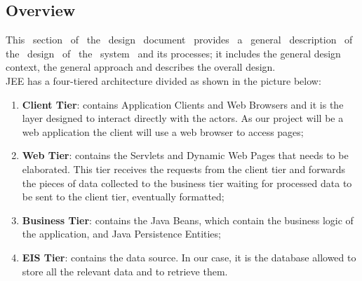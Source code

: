\documentclass[a4paper,11pt]{report} %
\begin{document}
	\subsection{Overview} This  section  of  the  design  document  provides  a  general  description  of  the  design  of  the  system  and  its  processes;  it includes  the  general  design  context,  the  general  approach  and  describes  the overall design.\\JEE has a four-tiered architecture divided as shown in the picture below:\\
		\begin{minipage}{\linewidth}
		\end{minipage}	
		\begin{enumerate}
			\item \textbf{Client Tier}: contains Application Clients and Web Browsers and it is the layer designed to interact directly with the actors. As our project will be a web application the client will use a web browser to access pages;
			\item \textbf{Web Tier}: contains the Servlets and Dynamic Web Pages that needs to be elaborated. This tier receives the requests from the client tier and forwards the pieces of data collected to the business tier waiting for processed data to be sent to the client tier, eventually formatted;
			\item \textbf{Business Tier}: contains the Java Beans, which contain the business logic of the application, and Java Persistence Entities;
			\item \textbf{EIS Tier}: contains the data source. In our case, it is the database allowed to store all the relevant data and to retrieve them.									
		\end{enumerate}
\end{document}
